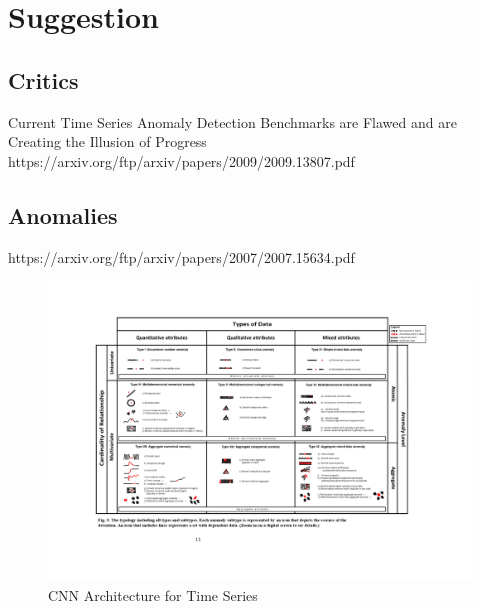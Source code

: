 \chapter{Suggestion}

\section{Critics}
Current Time Series Anomaly Detection Benchmarks are Flawed and are Creating the Illusion of Progress
https://arxiv.org/ftp/arxiv/papers/2009/2009.13807.pdf

\section{Anomalies}
https://arxiv.org/ftp/arxiv/papers/2007/2007.15634.pdf

\begin{figure}[h]
	\centering
	\includegraphics[scale=0.6]{Figures/Anomaly_types_t}
	\decoRule
	\caption[CNN Architecture for Time Series]{CNN Architecture for Time Series \parencite{Munir2019}}
	\label{fig:Anomaly_types}
\end{figure}
